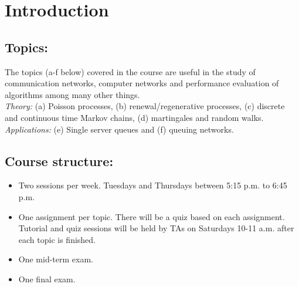 \documentclass[all-lectures.tex]{subfiles}
\begin{document}
\maketitle
\chapter*{Introduction}
\section*{Topics:} 
The topics (a-f below) covered in the course are useful in the study of communication networks, computer networks and performance evaluation of algorithms among many other things. \\

\textit{Theory:} (a) Poisson processes, (b) renewal/regenerative processes, (c) discrete and continuous time Markov chains, (d) martingales and random walks. \\
\indent \textit{Applications:} (e) Single server  queues and (f) queuing networks. \\
\section*{Course structure:}
\begin{itemize}
\item Two sessions per week. Tuesdays and Thursdays between 5:15 p.m. to 6:45 p.m.
\item One assignment per topic. There will be a quiz based on each assignment. Tutorial and quiz sessions will be held by TAs on Saturdays 10-11 a.m. after each topic is finished.
\item One mid-term exam.
\item One final exam.
\end{itemize}
\end{document}
